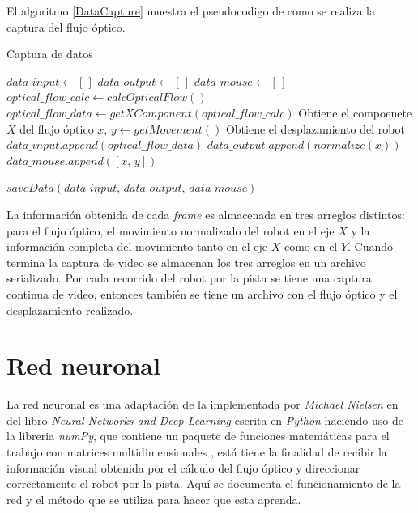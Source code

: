 \documentclass{iccmemoria}
\begin{document}
El algoritmo \ref{DataCapture} muestra el pseudocodigo de como se realiza la captura del flujo óptico.\\

\begin{algorithm}[H]
\caption{Captura de datos}\label{DataCapture}
\begin{algorithmic}[1]
\State $data\_input \gets [\,]$
\State $data\_output \gets [\,]$
\State $data\_mouse \gets [\,]$
\State $optical\_flow\_calc \gets calcOpticalFlow()$ 
\State $optical\_flow\_data \gets getXComponent(optical\_flow\_calc)$ \Comment Obtiene el compoenete $X$ del flujo óptico
\State $x,\, y \gets getMovement()$ \Comment Obtiene el desplazamiento del robot
\State $data\_input.append(optical\_flow\_data)$
\State $data\_output.append(normalize(x))$
\State $data\_mouse.append([x,\, y])$
\EndWhile

\State $saveData(data\_input,\, data\_output,\, data\_mouse)$
\EndFunction
\end{algorithmic}
\end{algorithm}

La información obtenida de cada \emph{frame} es almacenada en tres arreglos distintos: para el flujo óptico, el movimiento normalizado del robot en el eje $X$ y la información completa del movimiento tanto en el eje $X$ como en el $Y$. Cuando termina la captura de video se almacenan los tres arreglos en un archivo serializado. Por cada recorrido del robot por la pista se tiene una captura continua de video, entonces también se tiene un archivo con el flujo óptico y el desplazamiento realizado.\\

\section{Red neuronal}

La red neuronal es una adaptación de la implementada por \emph{Michael Nielsen} en del libro \emph{Neural Networks and Deep Learning} escrita en \emph{Python} \cite{NeuralNetworksAndDeepLearning} haciendo uso de la libreria \emph{numPy}, que contiene un paquete de funciones matemáticas para el trabajo con matrices multidimensionales \cite{numpy}, está tiene la finalidad de recibir la información visual obtenida por el cálculo del flujo óptico y direccionar correctamente el robot por la pista. Aquí se documenta el funcionamiento de la red y el método que se utiliza para hacer que esta aprenda.\\
\end{document}
